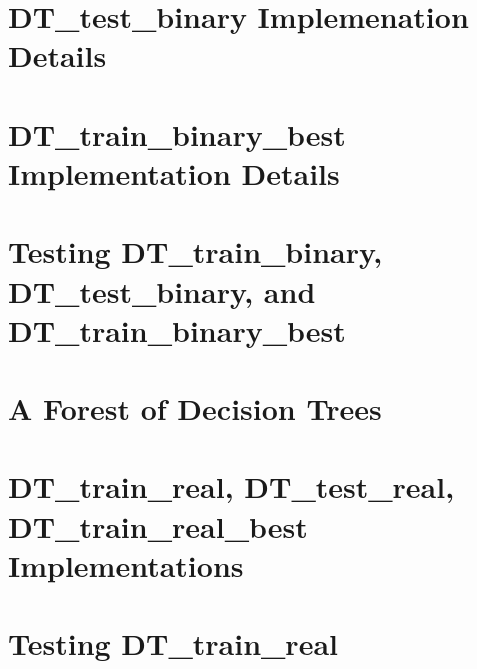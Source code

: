 \documentclass{article}
\begin{document}
\section{DT\_test\_binary Implemenation Details}
\section{DT\_train\_binary\_best Implementation Details}
\section{Testing DT\_train\_binary, DT\_test\_binary, and DT\_train\_binary\_best}
\section{A Forest of Decision Trees}
\section{DT\_train\_real, DT\_test\_real, DT\_train\_real\_best Implementations}
\section{Testing DT\_train\_real}
\end{document}
